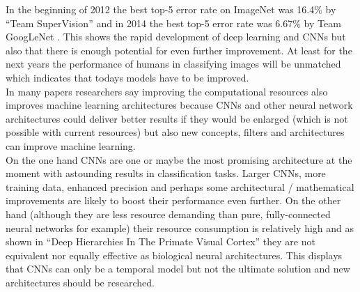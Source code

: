 \documentclass[12pt,twoside]{article}
\theoremstyle{plain}
\theoremstyle{definition}
\theoremstyle{remark}
\begin{document}
In the beginning of 2012 the best top-5 error rate on ImageNet was 16.4\% by \enquote{Team SuperVision} and in 2014 the best top-5 error rate was 6.67\% by Team GoogLeNet \cite{GoogLeNet}. This shows the rapid development of deep learning and CNNs but also that there is enough potential for even further improvement. At least for the next years the performance of humans in classifying images will be unmatched which indicates that todays models have to be improved.
\\
In many papers \cite{GoogLeNet, DeepNeuralNetworksObjectDetection-Szegedy, ImangeNetClassificationCNN-Krizhevsky, LearningDeepCompactImageTracking-Wang, MultiColumnDeepNeuralNetworksClassification-Ciresan} researchers say improving the computational resources also improves machine learning architectures because CNNs and other neural network architectures could deliver better results if they would be enlarged (which is not possible with current resources) but also new concepts, filters and architectures can improve machine learning.
\\
On the one hand CNNs are one or maybe the most promising architecture at the moment \cite{GoogLeNet, ImangeNetClassificationCNN-Krizhevsky} with astounding results in classification tasks. Larger CNNs, more training data, enhanced precision and perhaps some architectural / mathematical improvements are likely to boost their performance even further.
On the other hand (although they are less resource demanding than pure, fully-connected neural networks for example) their resource consumption is relatively high and as shown in \enquote{Deep Hierarchies In The Primate Visual Cortex} \cite{DeepHierarchiesVisualCortex-kruger} they are not equivalent nor equally effective as biological neural architectures. This displays that CNNs can only be a temporal model but not the ultimate solution and new architectures should be researched.




%
%
\newpage


\end{document}
